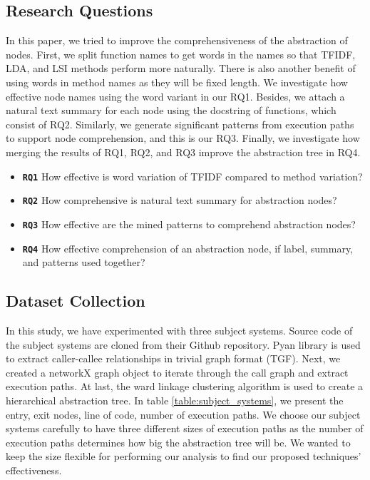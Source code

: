 \subsection{Research Questions}
In this paper, we tried to improve the comprehensiveness of the abstraction of nodes. First, we split function names to get words in the names so that TFIDF, LDA, and LSI methods perform more naturally. There is also another benefit of using words in method names as they will be fixed length. We investigate how effective node names using the word variant in our RQ1. Besides, we attach a natural text summary for each node using the docstring of functions, which consist of RQ2. Similarly, we generate significant patterns from execution paths to support node comprehension, and this is our RQ3. Finally, we investigate how merging the results of RQ1, RQ2, and RQ3 improve the abstraction tree in RQ4. 

\begin{itemize}
    
    \item \textbf{\texttt{RQ1}} How effective is word variation of TFIDF compared to method variation?
    \item \textbf{\texttt{RQ2}} How comprehensive is natural text summary for abstraction nodes?
    \item \textbf{\texttt{RQ3}} How effective are the mined patterns to comprehend abstraction nodes?
    \item \textbf{\texttt{RQ4}} How effective comprehension of an abstraction node, if label, summary, and patterns used together?
\end{itemize}

\subsection{Dataset Collection}
In this study, we have experimented with three subject systems. Source code of the subject systems are cloned from their Github repository. Pyan library is used to extract caller-callee relationships in trivial graph format (TGF). Next, we created a networkX graph object to iterate through the call graph and extract execution paths. At last, the ward linkage clustering algorithm is used to create a hierarchical abstraction tree. In table \ref{table:subject_systems}, we present the entry, exit nodes, line of code, number of execution paths. We choose our subject systems carefully to have three different sizes of execution paths as the number of execution paths determines how big the abstraction tree will be. We wanted to keep the size flexible for performing our analysis to find our proposed techniques' effectiveness. 

